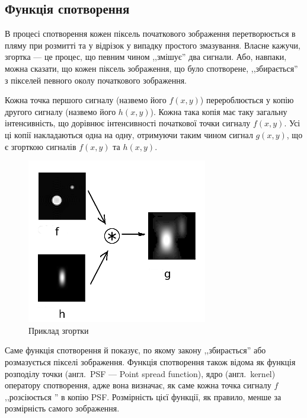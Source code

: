 \documentclass{diploma}
\begin{document}
    \subsection{Функція спотворення}
      В процесі спотворення кожен піксель початкового зображення
      перетворюється в пляму при розмитті та у відрізок у випадку
      простого змазування.
      Власне кажучи, згортка --- це процес, що певним чином ,,змішує'' два
      сигнали.
      Або, навпаки, можна сказати, що кожен піксель зображення, що було
      спотворене, ,,збирається'' з пікселей певного околу початкового
      зображення.

      Кожна точка першого сигналу (назвемо його $f\left( x, y\right)$)
      перероблюється у копію другого сигналу (назвемо його $h\left( x, y
      \right)$).
      Кожна така копія має таку загальну інтенсивність, що дорівнює
      інтенсивності початкової точки сигналу $f\left( x, y \right)$.
      Усі ці копії накладаються одна на одну, отримуючи таким чином сигнал
      $g\left( x, y \right)$, що є згорткою сигналів $f\left( x, y \right)$ та
      $h\left( x, y \right)$.

      \begin{figure}[!htp]
        \centering
        \includegraphics{conv.png}
        \caption{Приклад згортки}
        \label{fig:example-convolution}
      \end{figure}

      Саме функція спотворення й показує, по якому закону ,,збирається'' або
      розмазується пікселі зображення.
      Функція спотворення також відома як функція розподілу точки (англ.~PSF
      --- Point spread function), ядро (англ.~kernel) оператору спотворення,
      адже вона визначає, як саме кожна точка сигналу $f$ ,,розсіюється '' в
      копію PSF.
      Розмірність цієї функції, як правило, менше за розмірність самого
      зображення.
\end{document}
